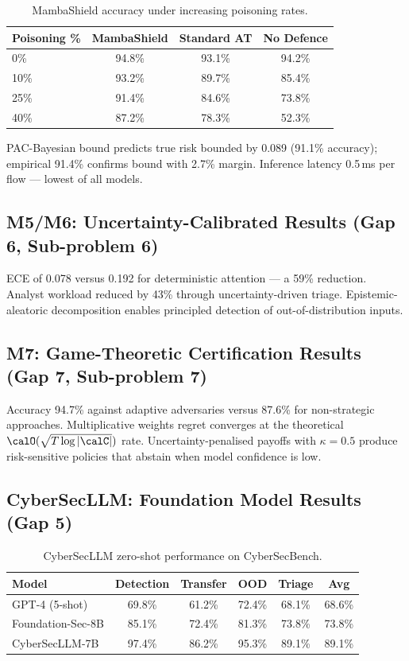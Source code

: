 \begin{table}[htbp]
\centering
\caption{MambaShield accuracy under increasing poisoning rates.}
\label{tab:mamba_results}
\begin{tabular}{lccc}
\toprule
Poisoning \% & MambaShield & Standard AT & No Defence \\
\midrule
0\%  & 94.8\% & 93.1\% & 94.2\% \\
10\% & 93.2\% & 89.7\% & 85.4\% \\
25\% & 91.4\% & 84.6\% & 73.8\% \\
40\% & 87.2\% & 78.3\% & 52.3\% \\
\bottomrule
\end{tabular}
\end{table}

PAC-Bayesian bound predicts true risk bounded by 0.089 (91.1\% accuracy); empirical 91.4\% confirms bound with 2.7\% margin. Inference latency 0.5\,ms per flow --- lowest of all models.


\subsection{M5/M6: Uncertainty-Calibrated Results (Gap 6, Sub-problem 6)}

ECE of 0.078 versus 0.192 for deterministic attention --- a 59\% reduction. Analyst workload reduced by 43\% through uncertainty-driven triage. Epistemic-aleatoric decomposition enables principled detection of out-of-distribution inputs.


\subsection{M7: Game-Theoretic Certification Results (Gap 7, Sub-problem 7)}

Accuracy 94.7\% against adaptive adversaries versus 87.6\% for non-strategic approaches. Multiplicative weights regret converges at the theoretical $\calO(\sqrt{T\log|\calC|})$ rate. Uncertainty-penalised payoffs with $\kappa=0.5$ produce risk-sensitive policies that abstain when model confidence is low.


\subsection{CyberSecLLM: Foundation Model Results (Gap 5)}

\begin{table}[htbp]
\centering
\caption{CyberSecLLM zero-shot performance on CyberSecBench.}
\label{tab:cybersecllm_results}
\begin{tabular}{lccccc}
\toprule
Model & Detection & Transfer & OOD & Triage & Avg \\
\midrule
GPT-4 (5-shot)    & 69.8\% & 61.2\% & 72.4\% & 68.1\% & 68.6\% \\
Foundation-Sec-8B & 85.1\% & 72.4\% & 81.3\% & 73.8\% & 73.8\% \\
CyberSecLLM-7B    & 97.4\% & 86.2\% & 95.3\% & 89.1\% & 89.1\% \\
\bottomrule
\end{tabular}
\end{table}

